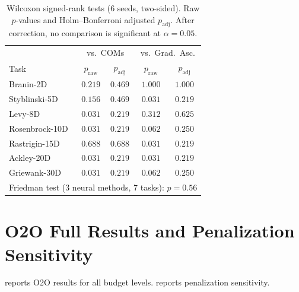 \documentclass{article}
\theoremstyle{plain}
\theoremstyle{remark}
\begin{document}
\begin{table}[h]
  \caption{Wilcoxon signed-rank tests (6 seeds, two-sided). Raw $p$-values and Holm--Bonferroni adjusted $p_{\mathrm{adj}}$. After correction, no comparison is significant at $\alpha{=}0.05$.}
  \label{tab:wilcoxon}
  \begin{center}
    \begin{small}
      \begin{tabular}{lcccc}
        \toprule
        & \multicolumn{2}{c}{vs.\ COMs} & \multicolumn{2}{c}{vs.\ Grad.\ Asc.} \\
        Task & $p_{\mathrm{raw}}$ & $p_{\mathrm{adj}}$ & $p_{\mathrm{raw}}$ & $p_{\mathrm{adj}}$ \\
        \midrule
        Branin-2D     & $0.219$ & $0.469$ & $1.000$ & $1.000$ \\
        Styblinski-5D & $0.156$ & $0.469$ & $0.031$ & $0.219$ \\
        Levy-8D       & $0.031$ & $0.219$ & $0.312$ & $0.625$ \\
        Rosenbrock-10D& $0.031$ & $0.219$ & $0.062$ & $0.250$ \\
        Rastrigin-15D & $0.688$ & $0.688$ & $0.031$ & $0.219$ \\
        Ackley-20D    & $0.031$ & $0.219$ & $0.031$ & $0.219$ \\
        Griewank-30D  & $0.031$ & $0.219$ & $0.062$ & $0.250$ \\
        \midrule
        \multicolumn{5}{c}{Friedman test (3 neural methods, 7 tasks): $p = 0.56$} \\
        \bottomrule
      \end{tabular}
    \end{small}
  \end{center}
\end{table}

\section{O2O Full Results and Penalization Sensitivity}
\label{app:o2o}

 reports O2O results for all budget levels.
 reports penalization sensitivity.
\end{document}
